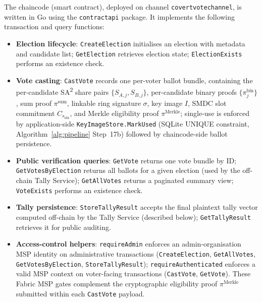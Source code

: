 The chaincode (smart contract), deployed on channel \texttt{covertvotechannel}, is written in Go using the \texttt{contractapi} package. It implements the following transaction and query functions:

\begin{itemize}
    \item \textbf{Election lifecycle}: \texttt{CreateElection} initialises an election with metadata and candidate list; \texttt{GetElection} retrieves election state; \texttt{ElectionExists} performs an existence check.
    \item \textbf{Vote casting}: \texttt{CastVote} records one per-voter ballot bundle, containing the per-candidate SA\textsuperscript{2} share pairs $\{S_{A,j}, S_{B,j}\}$, per-candidate binary proofs $\{\pi^{\text{bin}}_j\}$, sum proof $\pi^{\text{sum}}$, linkable ring signature $\sigma$, key image $I$, SMDC slot commitment $C_{s_{\text{idx}}}$, and Merkle eligibility proof $\pi^{\text{Merkle}}$; single-use is enforced by application-side \texttt{KeyImageStore.MarkUsed} (SQLite UNIQUE constraint, Algorithm~\ref{alg:pipeline} Step~17b) followed by chaincode-side ballot persistence.
    \item \textbf{Public verification queries}: \texttt{GetVote} returns one vote bundle by ID; \texttt{GetVotesByElection} returns all ballots for a given election (used by the off-chain Tally Service); \texttt{GetAllVotes} returns a paginated summary view; \texttt{VoteExists} performs an existence check.
    \item \textbf{Tally persistence}: \texttt{StoreTallyResult} accepts the final plaintext tally vector computed off-chain by the Tally Service (described below); \texttt{GetTallyResult} retrieves it for public auditing.
    \item \textbf{Access-control helpers}: \texttt{requireAdmin} enforces an admin-organisation MSP identity on administrative transactions (\texttt{CreateElection}, \texttt{GetAllVotes}, \texttt{GetVotesByElection}, \texttt{StoreTallyResult}); \texttt{requireAuthenticated} enforces a valid MSP context on voter-facing transactions (\texttt{CastVote}, \texttt{GetVote}). These Fabric MSP gates complement the cryptographic eligibility proof $\pi^{\text{Merkle}}$ submitted within each \texttt{CastVote} payload.
\end{itemize}

